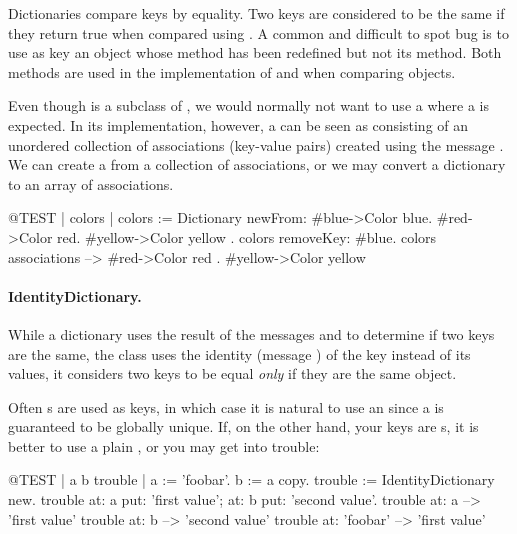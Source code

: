 \documentclass[a4paper,10pt,twoside]{book}
\begin{document}
Dictionaries compare keys by equality.
Two keys are considered to be the same if they return true when compared using \ct{=}.
A common and difficult to spot bug is to use as key an object whose \ct{=} method has been redefined but not its  method.
Both methods are used in the implementation of  and when comparing objects.

Even though  is a subclass of , we would normally not want to use a  where a  is expected.
In its implementation, however, a  can be seen as consisting of an unordered collection of associations (key-value pairs) created using the message .
We can create a  from a collection of associations, or we may convert a dictionary to an array of associations.

\begin{code}{@TEST | colors |}
colors := Dictionary newFrom: { #blue->Color blue. #red->Color red. #yellow->Color yellow }.
colors removeKey: #blue.
colors associations --> {#red->Color red . #yellow->Color yellow}
\end{code}

\paragraph{IdentityDictionary.}
While a dictionary uses the result of the messages \ct{=} and  to determine if two keys are the same, the class  uses the identity (message ) of the key instead of its values, \ie it considers two keys to be equal \emph{only} if they are the same object.

Often s are used as keys, in which case it is natural to use an  since a  is guaranteed to be globally unique.
If, on the other hand, your keys are s, it is better to use a plain , or you may get into trouble:

\begin{code}{@TEST | a b trouble |}
a := 'foobar'.
b := a copy.
trouble := IdentityDictionary new.
trouble 
    at: a put: 'first value'; 
    at: b put: 'second value'.
trouble at: a          --> 'first value'
trouble at: b          --> 'second value'
trouble at: 'foobar' --> 'first value'
\end{code}
\end{document}

